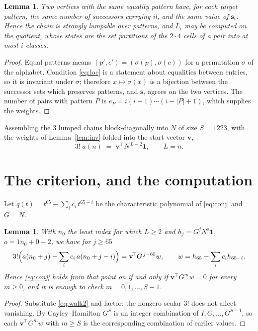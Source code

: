 \documentclass[11pt,a4paper]{article}
\theoremstyle{plain}
\newtheorem{lemma}[theorem]{Lemma}
\theoremstyle{definition}
\begin{document}
\begin{lemma}\label{lem:lump}
Two vertices with the same equality pattern have, for each target pattern, the same number of
successors carrying it, and the same value of $\mathbf{s}_i$. Hence the chain is strongly
lumpable over patterns, and $L_i$ may be computed on the quotient, whose states are the set
partitions of the $2\cdot4$ cells of a pair into at most $i$ classes.
\end{lemma}

\begin{proof}
Equal patterns means $(p',c')=(\sigma(p),\sigma(c))$ for a permutation $\sigma$ of the
alphabet. Condition \eqref{eq:loc} is a statement about equalities between entries, so it is
invariant under $\sigma$; therefore $x\mapsto\sigma(x)$ is a bijection between the successor
sets which preserves patterns, and $\mathbf{s}_i$ agrees on the two vertices. The number of
pairs with pattern $P$ is $e_P=i(i-1)\cdots(i-|P|+1)$, which supplies the weights.
\end{proof}

Assembling the $3$ lumped chains block-diagonally into $N$ of size $S=1223$, with the
weights of Lemma~\ref{lem:inv} folded into the start vector $\mathbf{v}$,
\begin{equation}\label{eq:walk2}
3!\;a(n)\;=\;\mathbf{v}^{\!\top}N^{\,L-2}\mathbf{1},\qquad L=n .
\end{equation}

\section{The criterion, and the computation}

Let $q(t)=t^{65}-\sum_i c_i\,t^{65-i}$ be the characteristic polynomial of
\eqref{eq:conj} and $G=N$.

\begin{lemma}\label{lem:crit}
With $n_0$ the least index for which $L\ge2$ and $h_j=G^{j}N^{o}\mathbf{1}$,
$o=1n_0+0-2$, we have for $j\ge65$
\[
3!\Bigl(a(n_0+j)-\sum_i c_i\,a(n_0+j-i)\Bigr)
=\mathbf{v}^{\!\top}G^{\,j-65}w,\qquad
w=h_{65}-\sum_i c_i h_{65-i} .
\]
Hence \eqref{eq:conj} holds from that point on if and only if
$\mathbf{v}^{\!\top}G^{m}w=0$ for every $m\ge0$, and it is enough to check
$m=0,1,\dots,S-1$.
\end{lemma}

\begin{proof}
Substitute \eqref{eq:walk2} and factor; the nonzero scalar $3!$ does not affect
vanishing. By Cayley--Hamilton $G^{S}$ is an integer combination of $I,G,\dots,G^{S-1}$,
so each $\mathbf{v}^{\!\top}G^{m}w$ with $m\ge S$ is the corresponding combination of
earlier values.
\end{proof}
\end{document}
